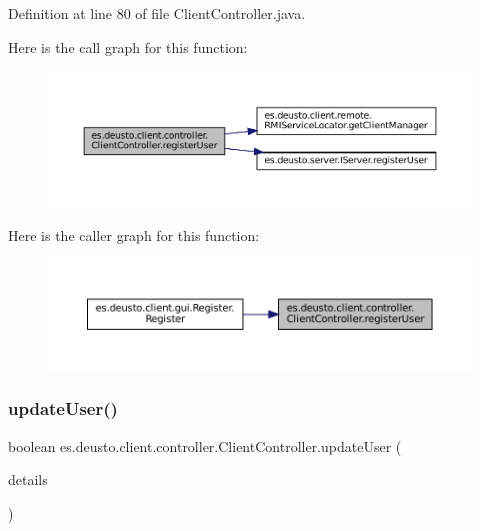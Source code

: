 Definition at line 80 of file Client\+Controller.\+java.

Here is the call graph for this function\+:
\nopagebreak
\begin{figure}[H]
\begin{center}
\leavevmode
\includegraphics[width=350pt]{classes_1_1deusto_1_1client_1_1controller_1_1_client_controller_a8f77e4957f536e48d7012d643d2c6cb8_cgraph}
\end{center}
\end{figure}
Here is the caller graph for this function\+:
\nopagebreak
\begin{figure}[H]
\begin{center}
\leavevmode
\includegraphics[width=350pt]{classes_1_1deusto_1_1client_1_1controller_1_1_client_controller_a8f77e4957f536e48d7012d643d2c6cb8_icgraph}
\end{center}
\end{figure}
\mbox{\label{classes_1_1deusto_1_1client_1_1controller_1_1_client_controller_ad1a2384c7c7f73d40d8d50c4bf77be7d}} 
\subsubsection{\texorpdfstring{updateUser()}{updateUser()}}
{\footnotesize\ttfamily boolean es.\+deusto.\+client.\+controller.\+Client\+Controller.\+update\+User (\begin{DoxyParamCaption}\item[{\mbox{\hyperlink{classes_1_1deusto_1_1server_1_1data_1_1_user_details_d_t_o}{User\+Details\+D\+TO}}}]{details }\end{DoxyParamCaption})}



